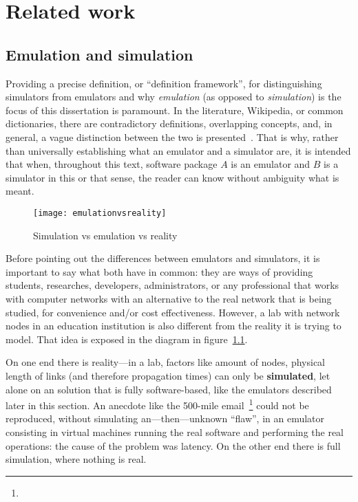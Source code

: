 
\chapter{Related work}
\label{ch:relatedwork}

\section{Emulation and simulation}
\label{sec:emulationsimulation}

Providing a precise definition, or ``definition framework'', for distinguishing simulators from emulators and why \emph{emulation} (as opposed to \emph{simulation}) is the focus of this dissertation is paramount.
In the literature, Wikipedia, or common dictionaries, there are contradictory definitions, overlapping concepts, and, in general, a vague distinction between the two is presented~\cite{netsimoremu}. %
That is why, rather than universally establishing what an emulator and a simulator are, it is intended that when, throughout this text, software package $A$ is an emulator and $B$ is a simulator in this or that sense, the reader can know without ambiguity what is meant.

\begin{figure}
  \centering
  \texttt{[image: emulationvsreality]}
  \caption{Simulation vs emulation vs reality}
  \label{fig:emulationvsreality}
\end{figure}

Before pointing out the differences between emulators and simulators, it is important to say what both have in common: they are ways of providing students, researches, developers, administrators, or any professional that works with computer networks with an alternative to the real network that is being studied, for convenience and/or cost effectiveness.
However, a lab with network nodes in an education institution is also different from the reality it is trying to model. That idea is exposed in the diagram in figure~\ref{fig:emulationvsreality}.

On one end there is reality---in a lab, factors like amount of nodes, physical length of links (and therefore propagation times) can only be \textbf{simulated}, let alone on an solution that is fully software-based, like the emulators described later in this section.
An anecdote like the 500-mile email~\footnote{} could not be reproduced, without simulating an---then---unknown ``flaw'', in an emulator consisting in virtual machines running the real software and performing the real operations: the cause of the problem was latency.
On the other end there is full simulation, where nothing is real.

